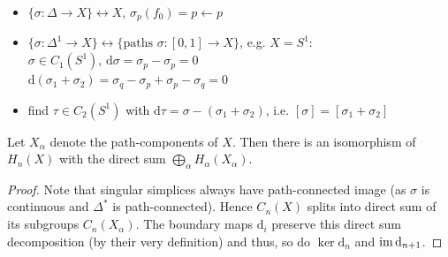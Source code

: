 \documentclass[a4paper,11pt]{article}
\begin{document}
			\begin{eg}\phantom{k}
				\begin{itemize}
					\item $\{\sigma:\Delta\rightarrow X\}\longleftrightarrow X$, $\sigma_{p}(f_0)=p\leftarrow p$
					\item $\{\sigma:\Delta^{1}\rightarrow X\}\longleftrightarrow\{\textrm{paths }\sigma:[0,1]\rightarrow X\}$, e.g. $X=S^{1}$:\\
					 $\sigma\in C_1(S^1),\,\mathrm{d}\sigma=\sigma_p-\sigma_p=0$\\
					 $\mathrm{d}(\sigma_1+\sigma_2)=\sigma_q-\sigma_p+\sigma_p-\sigma_q=0$
					\item find $\tau\in C_2(S^1)$ with $\mathrm{d}\tau=\sigma-(\sigma_1+\sigma_2)$, i.e. $[\sigma]=[\sigma_1+\sigma_2]$
				\end{itemize}
			\end{eg}

			\begin{prop}\label{prop--pathcomponents}
				Let $X_\alpha$ denote the path-components of $X$. Then there is an isomorphism of $H_n(X)$ with the direct sum $\bigoplus_\alpha H_\alpha(X_\alpha)$.
			\end{prop}
			\begin{proof}
				Note that singular simplices always have path-connected image (as $\sigma$ is continuous and $\Delta^\ast$ is path-connected). Hence $C_n(X)$ splits into direct sum of its subgroups $C_n(X_\alpha)$. The boundary maps $\mathrm{d}_i$ preserve this direct sum decomposition (by their very definition) and thus, so do $\ker\mathrm{d}_n$ and $\operatorname{im}\mathrm{d}_{n+1}$. 
			\end{proof}
\end{document}
